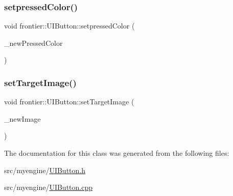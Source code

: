\mbox{\label{classfrontier_1_1_u_i_button_ae326211a2323793403317c8e7069ddb6}} 
\subsubsection{\texorpdfstring{setpressed\+Color()}{setpressedColor()}}
{\footnotesize\ttfamily void frontier\+::\+U\+I\+Button\+::setpressed\+Color (\begin{DoxyParamCaption}\item[{glm\+::vec3}]{\+\_\+new\+Pressed\+Color }\end{DoxyParamCaption})}

\mbox{\label{classfrontier_1_1_u_i_button_a6696828bc5e44fd3f3ce112adaae5e01}} 
\subsubsection{\texorpdfstring{set\+Target\+Image()}{setTargetImage()}}
{\footnotesize\ttfamily void frontier\+::\+U\+I\+Button\+::set\+Target\+Image (\begin{DoxyParamCaption}\item[{std\+::weak\+\_\+ptr$<$ \hyperlink{classfrontier_1_1_u_i_image}{U\+I\+Image} $>$}]{\+\_\+new\+Image }\end{DoxyParamCaption})}



The documentation for this class was generated from the following files\+:\begin{DoxyCompactItemize}
\item 
src/myengine/\hyperlink{_u_i_button_8h}{U\+I\+Button.\+h}\item 
src/myengine/\hyperlink{_u_i_button_8cpp}{U\+I\+Button.\+cpp}\end{DoxyCompactItemize}
